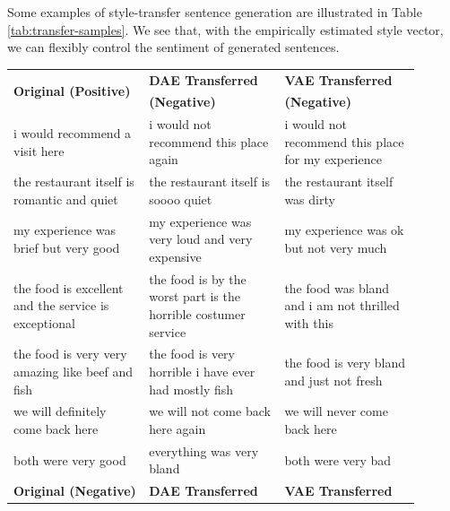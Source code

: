 Some examples of style-transfer sentence generation are illustrated in Table \ref{tab:transfer-samples}. We see that, with the empirically estimated style vector, we can flexibly control the sentiment of generated sentences.

\begin{table}[ht]
	\centering
	\begin{tabular}{| p{0.3\linewidth} | p{0.3\linewidth} | p{0.3\linewidth} |}
		\hline
		\multirow{2}{*}{\textbf{Original (Positive)}}          & \textbf{DAE Transferred}                                       & \textbf{VAE Transferred}                                    \\
		                                                       & \textbf{(Negative)}                                            & \textbf{(Negative)}                                         \\
		\hline
		i would recommend a visit here                         & i would not recommend this place again                         & i would not recommend this place for my experience          \\
		\hline
		the restaurant itself is romantic and quiet            & the restaurant itself is soooo quiet                           & the restaurant itself was dirty                             \\
		\hline
		my experience was brief but very good                  & my experience was very loud and very expensive                 & my experience was ok but not very much                      \\
		\hline
		the food is excellent and the service is exceptional   & the food is by the worst part is the horrible costumer service & the food was bland and i am not thrilled with this          \\
		\hline
		the food is very very amazing like beef and fish       & the food is very horrible i have ever had mostly fish          & the food is very bland and just not fresh                   \\
		\hline
		we will definitely come back here                      & we will not come back here again                               & we will never come back here                                \\
		\hline
		both were very good                                    & everything was very bland                                      & both were very bad                                          \\
		\hline
		\hline
		\multirow{2}{*}{\textbf{Original (Negative)}}          & \textbf{DAE Transferred}                                       & \textbf{VAE Transferred}                                    \\

\end{tabular}
\end{table}
